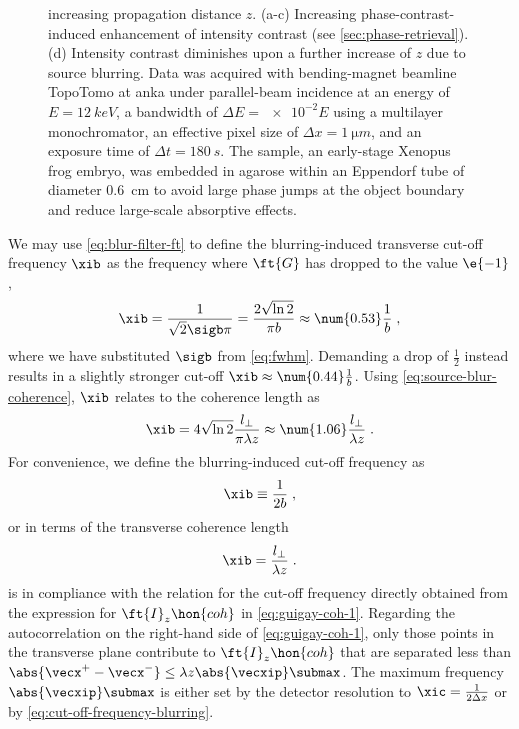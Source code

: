 \documentclass[
twoside,
openright,
titlepage,
numbers=noenddot,
headinclude,
fleqn,
a4paper,
footinclude=true,
cleardoublepage=empty,
abstractoff,
BCOR=5mm,
paper=a4,
fontsize=11pt,
british,ngerman,american,
]{scrreprt}
\begin{document}
\begin{figure}
{    increasing propagation distance $z$.  (a-c) Increasing
    phase-contrast-induced enhancement of intensity contrast (see
    \cref{sec:phase-retrieval}).  (d) Intensity contrast diminishes
    upon a further increase of $z$ due to source blurring.  Data was
    acquired with bending-magnet beamline TopoTomo at \ac{anka} under
    parallel-beam incidence at an energy of $E=\SI{12}{keV}$, a
    bandwidth of $\Delta E=\num{e-2}E$ using a multilayer
    monochromator, an effective pixel size of $\Delta x =
    \SI{1}{\micro m}$, and an exposure time of $\Delta t=\SI{180}{s}$.
    The sample, an early-stage Xenopus frog embryo, was embedded in
    agarose within an Eppendorf tube of diameter \SI{0.6}{cm} to avoid
    large phase jumps at the object boundary and reduce large-scale
    absorptive effects.}
  \label{fig:intensity-sequence-anka}
\end{figure}

We may use \cref{eq:blur-filter-ft} to define the blurring-induced
transverse cut-off frequency $\xib$ as the frequency where $\ft{G}$
has dropped to the value $\e{-1}$,
\begin{equation}
  \label{eq:cut-off-frequency-blurring-0}
  \xib = \frac{1}{\sqrt{2}\sigb\pi}
  = \frac{2\sqrt{\ln{2}}}{\pi b} 
  \approx \num{0.53} \frac{1}{b} \;,
\end{equation}
where we have substituted $\sigb$ from \cref{eq:fwhm}.  Demanding a
drop of $\frac12$ instead results in a slightly stronger cut-off
$\xib\approx \num{0.44}\frac{1}{b}$.  Using
\cref{eq:source-blur-coherence},  $\xib$ relates to the coherence
length as
\begin{equation}
  \label{eq:cut-off-frequency-coherence}
   \xib = 4\sqrt{\ln{2}}\frac{l_{\perp}}{\pi\lambda z} 
   \approx \num{1.06} \frac{l_\perp}{\lambda z} \;.
\end{equation}
For convenience, we define the blurring-induced cut-off frequency as
\begin{equation}
  \label{eq:cut-off-frequency-blurring}
  \xib \equiv  \frac{1}{2 b} \;,
\end{equation}
or in terms of the transverse coherence length 
\begin{equation}
  \label{eq:cut-off-frequency-blurring-coherence}
  \xib = \frac{l_{\perp}}{\lambda z} \;.
\end{equation}
 is in compliance with
the relation for the cut-off frequency directly obtained from the
expression for $\ft{I}_z\hon{coh}$ in \cref{eq:guigay-coh-1}.
Regarding the autocorrelation on the right-hand side of
\cref{eq:guigay-coh-1}, only those points in the transverse plane
contribute to $\ft{I}_z\hon{coh}$ that are separated less than
$\abs{\vecx^+-\vecx^-}\le\lambda z \abs{\vecxip}\submax$.  The maximum
frequency $\abs{\vecxip}\submax$ is either set by the detector
resolution to $\xic=\frac{1}{2\Delta x}$ or by
\cref{eq:cut-off-frequency-blurring}.
\end{document}
